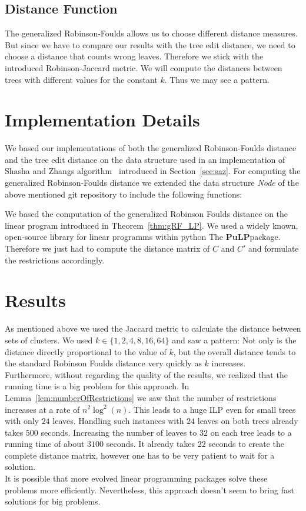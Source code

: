 \subsection{Distance Function}
The generalized Robinson-Foulds allows us to choose different distance measures. But since we have to compare our results with the tree edit distance, we need to choose a distance that counts wrong leaves. Therefore we stick with the introduced Robinson-Jaccard metric. We will compute the distances between trees with different values for the constant $k$. Thus we may see a pattern.

\section{Implementation Details}
We based our implementations of both the generalized Robinson-Foulds distance and the tree edit distance on the data structure used in an implementation of Shasha and Zhangs algorithm~\cite{Hen} introduced in Section~\ref{sec:saz}. For computing the generalized Robinson-Foulds distance we extended the data structure \textit{Node} of the above mentioned git repository to include the following functions:

We based the computation of the generalized Robinson Foulds distance on the linear program introduced in Theorem~\ref{thm:gRF_LP}. We used a widely known, open-source library for linear programms within python The \textbf{PuLP}package. Therefore we just had to compute the distance matrix of $C$ and $C'$ and formulate the restrictions accordingly. 

\section{Results}
As mentioned above we used the Jaccard metric to calculate the distance between sets of clusters. We used $k \in \{1,2,4,8,16,64\}$ and saw a pattern: Not only is the distance directly proportional to the value of $k$, but the overall distance tends to the standard Robinson Foulds distance very quickly as $k$ increases. \\
Furthermore, without regarding the quality of the results, we realized that the running time is a big problem for this approach. In Lemma~\ref{lem:numberOfRestrictions} we saw that the number of restrictions increases at a rate of $n^2\log^2(n)$. This leads to a huge ILP even for small trees with only $24$ leaves. Handling such instances with $24$ leaves on both trees already takes $500$ seconds. Increasing the number of leaves to $32$ on each tree leads to a running time of about $3100$ seconds. It already takes $22$ seconds to create the complete distance matrix, however one has to be very patient to wait for a solution.\\
It is possible that more evolved linear programming packages solve these problems more efficiently. Nevertheless, this approach doesn't seem to bring fast solutions for big problems.